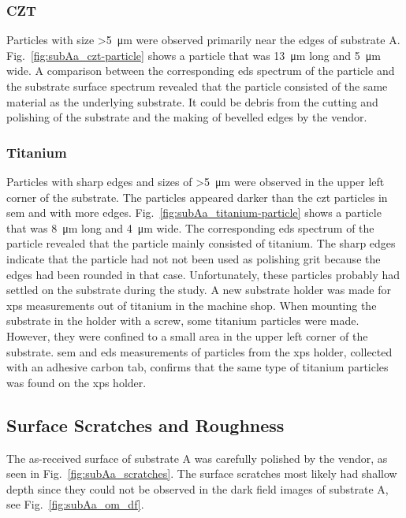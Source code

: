 \subsubsection{CZT}
Particles with size \SI{>5}{\micro\metre} were observed primarily near the edges of substrate A. Fig.~\ref{fig:subAa_czt-particle} shows a particle that was \SI{13}{\micro\metre} long and \SI{5}{\micro\metre} wide. A comparison between the corresponding \ac{eds} spectrum of the particle and the substrate surface spectrum revealed that the particle consisted of the same material as the underlying substrate. It could be debris from the cutting and polishing of the substrate and the making of bevelled edges by the vendor.


\subsubsection{Titanium}
Particles with sharp edges and sizes of \SI{>5}{\micro\metre} were observed in the upper left corner of the substrate. The particles appeared darker than the \ac{czt} particles in \ac{sem} and with more edges. Fig.~\ref{fig:subAa_titanium-particle} shows a particle that was \SI{8}{\micro\metre} long and \SI{4}{\micro\metre} wide. The corresponding \ac{eds} spectrum of the particle revealed that the particle mainly consisted of titanium. The sharp edges indicate that the particle had not not been used as polishing grit because the edges had been rounded in that case. Unfortunately, these particles probably had settled on the substrate during the study. A new substrate holder was made for \ac{xps} measurements out of titanium in the machine shop. When mounting the substrate in the holder with a screw, some titanium particles were made. However, they were confined to a small area in the upper left corner of the substrate. \Ac{sem} and \ac{eds} measurements of particles from the \ac{xps} holder, collected with an adhesive carbon tab, confirms that the same type of titanium particles was found on the \ac{xps} holder. %



\subsection{Surface Scratches and Roughness}
The as-received surface of substrate A was carefully polished by the vendor, as seen in Fig.~\ref{fig:subAa_scratches}. The surface scratches most likely had shallow depth since they could not be observed in the dark field images of substrate A, see Fig.~\ref{fig:subAa_om_df}.

